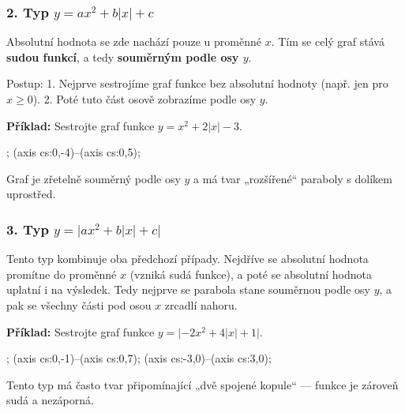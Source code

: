 \documentclass[12pt,a4paper]{article}
\begin{document}
\subsubsection*{2. Typ \(\displaystyle y = ax^2 + b|x| + c\)}

Absolutní hodnota se zde nachází pouze u proměnné \(x\).  
Tím se celý graf stává \textbf{sudou funkcí}, a tedy \textbf{souměrným podle osy \(y\)}.

Postup:
1. Nejprve sestrojíme graf funkce bez absolutní hodnoty (např. jen pro \(x \ge 0\)).
2. Poté tuto část osově zobrazíme podle osy \(y\).

\begin{examplebox}
\textbf{Příklad:}  
Sestrojte graf funkce \(y = x^2 + 2|x| - 3.\)

\begin{center}
\begin{axisgraph}[
  xmin=-4, xmax=4,
  ymin=-4, ymax=5,
  samples=200,
  width=9cm,
  height=6cm,
  title={$y = x^2 - 2|x| - 3$}
]
  ;
   (axis cs:0,-4)--(axis cs:0,5);
\end{axisgraph}
\end{center}

Graf je zřetelně souměrný podle osy \(y\) a má tvar „rozšířené“ paraboly s dolíkem uprostřed.
\end{examplebox}


\subsubsection*{3. Typ \(\displaystyle y = \lvert ax^2 + b|x| + c\rvert\)}

Tento typ kombinuje oba předchozí případy.  
Nejdříve se absolutní hodnota promítne do proměnné \(x\) (vzniká sudá funkce), a poté se absolutní hodnota uplatní i na výsledek.  
Tedy nejprve se parabola stane souměrnou podle osy \(y\), a pak se všechny části pod osou \(x\) zrcadlí nahoru.

\begin{examplebox}
\textbf{Příklad:}  
Sestrojte graf funkce \(y = \lvert -2x^2 + 4|x| + 1\rvert.\)

\begin{center}
\begin{axisgraph}[
  xmin=-3, xmax=3,
  ymin=-1, ymax=7,
  samples=200,
  width=9cm,
  height=6cm,
  title={$y = |-2x^2 + 4|x| + 1|$}
]
  ;
   (axis cs:0,-1)--(axis cs:0,7);
   (axis cs:-3,0)--(axis cs:3,0);
\end{axisgraph}
\end{center}

Tento typ má často tvar připomínající „dvě spojené kopule“ — funkce je zároveň sudá a nezáporná.
\end{examplebox}
\end{document}
